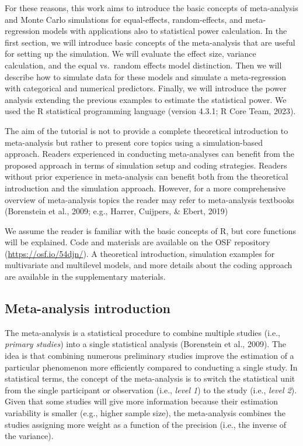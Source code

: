 \documentclass[
  man,floatsintext]{apa6}
\begin{document}
For these reasons, this work aims to introduce the basic concepts of meta-analysis and Monte Carlo simulations for equal-effects, random-effects, and meta-regression models with applications also to statistical power calculation. In the first section, we will introduce basic concepts of the meta-analysis that are useful for setting up the simulation. We will evaluate the effect size, variance calculation, and the equal vs.~random effects model distinction. Then we will describe how to simulate data for these models and simulate a meta-regression with categorical and numerical predictors. Finally, we will introduce the power analysis extending the previous examples to estimate the statistical power. We used the R statistical programming language (version 4.3.1; R Core Team, 2023).

The aim of the tutorial is not to provide a complete theoretical introduction to meta-analysis but rather to present core topics using a simulation-based approach. Readers experienced in conducting meta-analyses can benefit from the proposed approach in terms of simulation setup and coding strategies. Readers without prior experience in meta-analysis can benefit both from the theoretical introduction and the simulation approach. However, for a more comprehensive overview of meta-analysis topics the reader may refer to meta-analysis textbooks (Borenstein et al., 2009; e.g., Harrer, Cuijpers, \& Ebert, 2019)

We assume the reader is familiar with the basic concepts of R, but core functions will be explained. Code and materials are available on the OSF repository (\url{https://osf.io/54djn/}). A theoretical introduction, simulation examples for multivariate and multilevel models, and more details about the coding approach are available in the supplementary materials.

\subsection{Meta-analysis introduction}\label{meta-analysis-introduction}

The meta-analysis is a statistical procedure to combine multiple studies (i.e., \emph{primary studies}) into a single statistical analysis (Borenstein et al., 2009). The idea is that combining numerous preliminary studies improve the estimation of a particular phenomenon more efficiently compared to conducting a single study. In statistical terms, the concept of the meta-analysis is to switch the statistical unit from the single participant or observation (i.e., \emph{level 1}) to the study (i.e., \emph{level 2}). Given that some studies will give more information because their estimation variability is smaller (e.g., higher sample size), the meta-analysis combines the studies assigning more weight as a function of the precision (i.e., the inverse of the variance).
\end{document}

